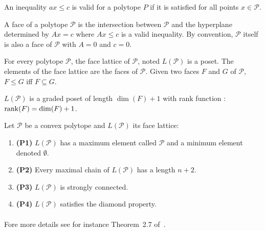 \begin{definition}
  An inequality $ax \le c$ is valid for a polytope $P$ if it is satisfied for all points $x \in \mathcal P$.
\end{definition}

\begin{definition}
  A face of a polytope $\mathcal P$ is the intersection between $\mathcal P$ and the hyperplane determined by $Ax = c$ where $Ax \le c$ is a valid inequality. By convention, $\mathcal P$ itself is also a face of $\mathcal P$ with $A=0$ and $c=0$.
\end{definition}

\begin{definition}
  For every polytope $\mathcal P$, the face lattice of $\mathcal P$, noted $L(\mathcal P)$ is a poset. The elements of the face lattice are the faces of $\mathcal P$. Given two faces $F$ and $G$ of $\mathcal P$, $F \le G$ iff $F \subseteq G$.
\end{definition}

\begin{property}
  $L(\mathcal P)$ is a graded poset of length $\dim(F) + 1$ with rank function : $\operatorname{rank}(F) = \dim(F) + 1$.
\end{property}

\begin{property}
  \label{major-properties}
  Let $\mathcal P$ be a convex polytope and $L(\mathcal P)$ its face lattice:

  \begin{enumerate}
    \item \textbf{(P1)} $L(\mathcal P)$ has a maximum element called $\mathcal P$ and a minimum element denoted $\emptyset$.
    \item \textbf{(P2)} Every maximal chain of $L(\mathcal P)$ has a length $n + 2$.
    \item \textbf{(P3)} $L(\mathcal P)$ is strongly connected.
    \item \textbf{(P4)} $L(\mathcal P)$ satisfies the diamond property.
  \end{enumerate}
\end{property}

\paragraph{}
Fore more details see for instance Theorem~2.7 of~\cite{polytopes}.
